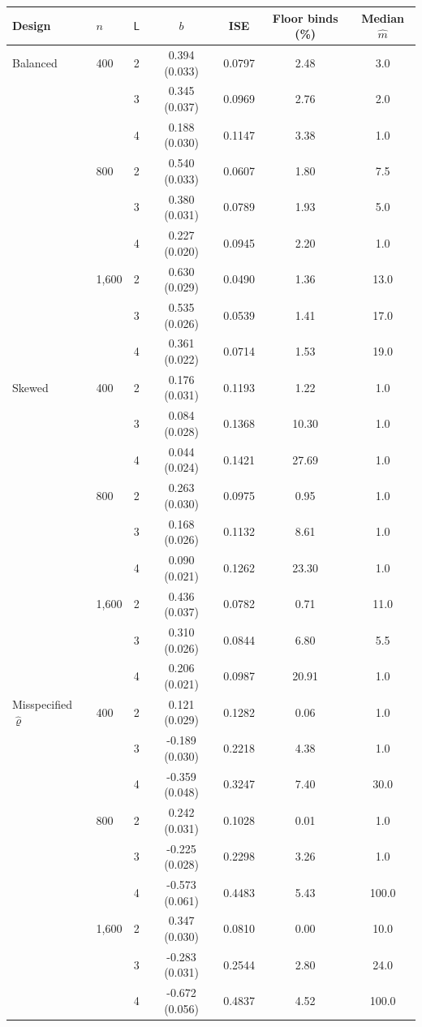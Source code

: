 \begin{tabular}{llccccc}
\toprule
Design & $n$ & $\mathsf L$ & $b$ & ISE & Floor binds (\%) & Median $\hat m$ \\
\midrule
Balanced & 400 & 2 & 0.394 (0.033) & 0.0797 & 2.48 & 3.0 \\
 &  & 3 & 0.345 (0.037) & 0.0969 & 2.76 & 2.0 \\
 &  & 4 & 0.188 (0.030) & 0.1147 & 3.38 & 1.0 \\
 & 800 & 2 & 0.540 (0.033) & 0.0607 & 1.80 & 7.5 \\
 &  & 3 & 0.380 (0.031) & 0.0789 & 1.93 & 5.0 \\
 &  & 4 & 0.227 (0.020) & 0.0945 & 2.20 & 1.0 \\
 & 1,600 & 2 & 0.630 (0.029) & 0.0490 & 1.36 & 13.0 \\
 &  & 3 & 0.535 (0.026) & 0.0539 & 1.41 & 17.0 \\
 &  & 4 & 0.361 (0.022) & 0.0714 & 1.53 & 19.0 \\
\addlinespace
Skewed & 400 & 2 & 0.176 (0.031) & 0.1193 & 1.22 & 1.0 \\
 &  & 3 & 0.084 (0.028) & 0.1368 & 10.30 & 1.0 \\
 &  & 4 & 0.044 (0.024) & 0.1421 & 27.69 & 1.0 \\
 & 800 & 2 & 0.263 (0.030) & 0.0975 & 0.95 & 1.0 \\
 &  & 3 & 0.168 (0.026) & 0.1132 & 8.61 & 1.0 \\
 &  & 4 & 0.090 (0.021) & 0.1262 & 23.30 & 1.0 \\
 & 1,600 & 2 & 0.436 (0.037) & 0.0782 & 0.71 & 11.0 \\
 &  & 3 & 0.310 (0.026) & 0.0844 & 6.80 & 5.5 \\
 &  & 4 & 0.206 (0.021) & 0.0987 & 20.91 & 1.0 \\
\addlinespace
Misspecified $\hat\varrho$ & 400 & 2 & 0.121 (0.029) & 0.1282 & 0.06 & 1.0 \\
 &  & 3 & -0.189 (0.030) & 0.2218 & 4.38 & 1.0 \\
 &  & 4 & -0.359 (0.048) & 0.3247 & 7.40 & 30.0 \\
 & 800 & 2 & 0.242 (0.031) & 0.1028 & 0.01 & 1.0 \\
 &  & 3 & -0.225 (0.028) & 0.2298 & 3.26 & 1.0 \\
 &  & 4 & -0.573 (0.061) & 0.4483 & 5.43 & 100.0 \\
 & 1,600 & 2 & 0.347 (0.030) & 0.0810 & 0.00 & 10.0 \\
 &  & 3 & -0.283 (0.031) & 0.2544 & 2.80 & 24.0 \\
 &  & 4 & -0.672 (0.056) & 0.4837 & 4.52 & 100.0 \\
\bottomrule
\end{tabular}
